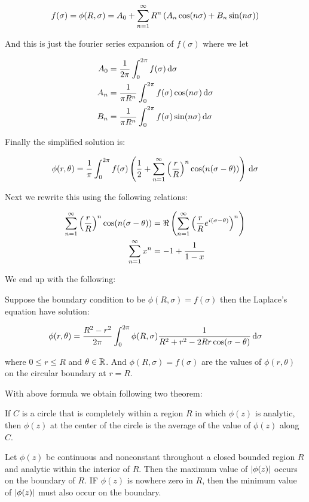 \documentclass{article}
\begin{document}
\[f(\sigma) = \phi(R,\sigma) =  A_0+\sum_{n=1}^\infty R^n \left( A_n \cos(n\sigma)+B_n\sin(n\sigma) \right)\]

And this is just the fourier series expansion of \(f(\sigma)\) where we let

\begin{align*}
    A_0 &= \frac{1}{2\pi}    \int_0^{2\pi} f(\sigma )\,\mathrm{d}\sigma\\
    A_n &= \frac{1}{\pi R^n} \int_0^{2\pi} f(\sigma) \cos(n\sigma)\,\mathrm{d}\sigma\\
    B_n &= \frac{1}{\pi R^n} \int_0^{2\pi} f(\sigma) \sin(n\sigma)\,\mathrm{d}\sigma
\end{align*}

Finally the simplified solution is:

\[\phi(r,\theta) = \frac{1}{\pi}\int_0^{2\pi} f(\sigma)\left( \frac{1}{2}+\sum_{n=1}^\infty \left( \frac{r}{R} \right)^n \cos(n(\sigma-\theta)) \right)\,\mathrm{d}\sigma\]

Next we rewrite this using the following relations:

\begin{align*}
    \sum_{n=1}^\infty \left( \frac{r}{R} \right)^n \cos(n(\sigma-\theta)) &= \Re\left( \sum_{n=1}^\infty \left( \frac{r}{R}e^{i(\sigma-\theta)} \right)^n  \right)\\
    \sum_{n=1}^\infty x^n &= -1+\frac{1}{1-x}
\end{align*}

We end up with the following:

\begin{theorem}
    Suppose the boundary condition to be \(\phi(R,\sigma)=f(\sigma)\) then the Laplace's equation have solution:

    \[\phi(r,\theta) = \frac{R^2-r^2}{2\pi} \int_0^{2\pi} \phi(R,\sigma) \frac{1}{R^2+r^2-2Rr\cos(\sigma-\theta)}\,\mathrm{d}\sigma\]

    where \(0\leq r\leq R\) and \(\theta\in \mathbb{R}\). And \(\phi(R,\sigma) = f(\sigma)\) are the values of \(\phi(r,\theta)\) on the circular boundary at \(r=R\).
\end{theorem}

With above formula we obtain following two theorem:

\begin{theorem}
    If \(C\) is a circle that is completely within a region \(R\) in which \(\phi(z)\) is analytic, then \(\phi(z)\) at the center of the circle is the average of the value of \(\phi(z)\) along \(C\).
\end{theorem}
\begin{theorem}
    Let \(\phi(z)\) be continuous and nonconstant throughout a closed bounded region \(R\) and analytic within the interior of \(R\). Then the maximum value of \(\left\vert\phi(z)\right\vert\) occurs on the boundary of \(R\). IF \(\phi(z)\) is nowhere zero in \(R\), then the minimum value of \(\left\vert\phi(z)\right\vert\) must also occur on the boundary.
\end{theorem}
\end{document}
